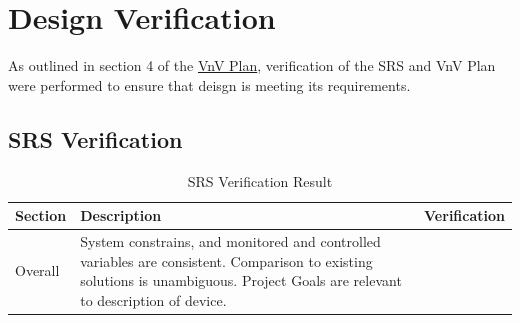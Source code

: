 \documentclass[12pt, titlepage]{article}
\begin{document}
\listoffigures %

\newpage


\section{Design Verification}
As outlined in section 4 of the \href{https://github.com/zakerl/Capstone_Project/blob/main/docs/VnVPlan/VnVPlan.pdf}{VnV Plan}, verification of the SRS and VnV Plan were performed to ensure that deisgn is meeting its requirements.
\subsection{SRS Verification}
\begin{center}
\begin{table} [H]
\caption{SRS Verification Result}
  \begin{tabular}{|p{1.5cm}|p{6.5cm}|p{6.9cm}|}
    \hline
    \textbf{Section}   & \textbf{Description} & \textbf{Verification}
    \\
    \hline
    Overall  & System constrains, and monitored and controlled variables are consistent. Comparison to existing solutions is unambiguous. Project Goals are relevant to description of device.
   

\end{tabular}
\end{table}
\end{center}
\end{document}
